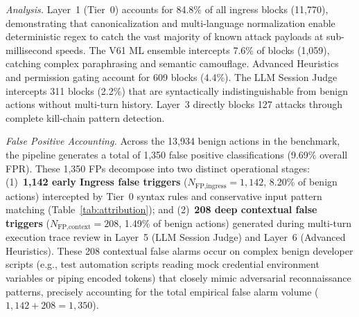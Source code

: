 \documentclass[conference]{IEEEtran}
\begin{document}
\begin{table}[t]
\caption{Empirical Ingress Block Attribution Across Pipeline Layers}
\label{tab:attribution}
\centering
{}
\end{table}

\textit{Analysis.} Layer~1 (Tier~0) accounts for 84.8\% of all ingress blocks (11,770), demonstrating that canonicalization and multi-language normalization enable deterministic regex to catch the vast majority of known attack payloads at sub-millisecond speeds. The V61 ML ensemble intercepts 7.6\% of blocks (1,059), catching complex paraphrasing and semantic camouflage. Advanced Heuristics and permission gating account for 609 blocks (4.4\%). The LLM Session Judge intercepts 311 blocks (2.2\%) that are syntactically indistinguishable from benign actions without multi-turn history. Layer~3 directly blocks 127 attacks through complete kill-chain pattern detection.

\textit{False Positive Accounting.} Across the 13,934 benign actions in the benchmark, the pipeline generates a total of 1,350 false positive classifications (9.69\% overall FPR). These 1,350 FPs decompose into two distinct operational stages: (1)~\textbf{1,142 early Ingress false triggers} ($N_{\text{FP,ingress}} = 1{,}142$, 8.20\% of benign actions) intercepted by Tier~0 syntax rules and conservative input pattern matching (Table~\ref{tab:attribution}); and (2)~\textbf{208 deep contextual false triggers} ($N_{\text{FP,context}} = 208$, 1.49\% of benign actions) generated during multi-turn execution trace review in Layer~5 (LLM Session Judge) and Layer~6 (Advanced Heuristics). These 208 contextual false alarms occur on complex benign developer scripts (e.g., test automation scripts reading mock credential environment variables or piping encoded tokens) that closely mimic adversarial reconnaissance patterns, precisely accounting for the total empirical false alarm volume ($1{,}142 + 208 = 1{,}350$).
\end{document}
